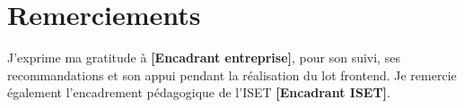 \chapter*{Remerciements}

J'exprime ma gratitude à \textbf{[Encadrant entreprise]}, pour son suivi, ses recommandations et son appui pendant la réalisation du lot frontend. Je remercie également l'encadrement pédagogique de l'ISET \textbf{[Encadrant ISET]}.
